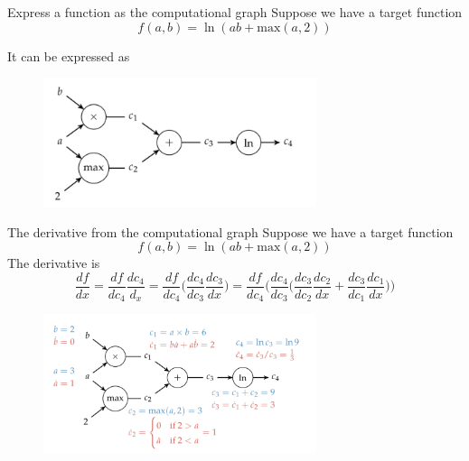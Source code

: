 \documentclass{beamer}
\begin{document}
\begin{frame}{Express a function as the computational graph}
Suppose we have a target function
\begin{equation*}
f(a, b) = \ln(ab + \textrm{max}(a, 2))
\end{equation*}

It can be expressed as
\begin{figure}
\centering
\includegraphics[width=80mm]{Figs/graph1.jpeg}
\end{figure}

\end{frame}

\begin{frame}{The derivative from the computational graph}
Suppose we have a target function
\begin{equation*}
f(a, b) = \ln(ab + \textrm{max}(a, 2))
\end{equation*}
The derivative is 
\begin{equation*}
\frac{df}{dx} = \frac{df}{dc_4}\frac{dc_4}{d_x} 
= \frac{df}{dc_4}\bigg(\frac{dc_4}{dc_3}\frac{dc_3}{dx}\bigg)
= \frac{df}{dc_4}\bigg(\frac{dc_4}{dc_3}\bigg(\frac{dc_3}{dc_2}\frac{dc_2}{dx} + \frac{dc_3}{dc_1}\frac{dc_1}{dx}\bigg)\bigg)
\end{equation*}

\begin{figure}
\centering
\includegraphics[width=80mm]{Figs/graph2.jpeg}
\end{figure}

\end{frame}
\end{document}
